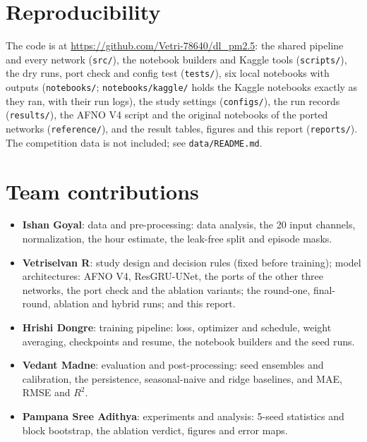 \documentclass[conference]{IEEEtran}
\begin{document}
\section*{Reproducibility}
The code is at \url{https://github.com/Vetri-78640/dl_pm2.5}: the shared pipeline and every network (\texttt{src/}), the notebook builders and Kaggle tools (\texttt{scripts/}), the dry runs, port check and config test (\texttt{tests/}), six local notebooks with outputs (\texttt{notebooks/}; \texttt{notebooks/kaggle/} holds the Kaggle notebooks exactly as they ran, with their run logs), the study settings (\texttt{configs/}), the run records (\texttt{results/}), the AFNO V4 script and the original notebooks of the ported networks (\texttt{reference/}), and the result tables, figures and this report (\texttt{reports/}). The competition data is not included; see \texttt{data/README.md}.

\section*{Team contributions}
\begin{itemize}
\item \textbf{Ishan Goyal}: data and pre-processing: data analysis, the 20 input channels, normalization, the hour estimate, the leak-free split and episode masks.
\item \textbf{Vetriselvan R}: study design and decision rules (fixed before training); model architectures: AFNO V4, ResGRU-UNet, the ports of the other three networks, the port check and the ablation variants; the round-one, final-round, ablation and hybrid runs; and this report.
\item \textbf{Hrishi Dongre}: training pipeline: loss, optimizer and schedule, weight averaging, checkpoints and resume, the notebook builders and the seed runs.
\item \textbf{Vedant Madne}: evaluation and post-processing: seed ensembles and calibration, the persistence, seasonal-naive and ridge baselines, and MAE, RMSE and $R^2$.
\item \textbf{Pampana Sree Adithya}: experiments and analysis: 5-seed statistics and block bootstrap, the ablation verdict, figures and error maps.
\end{itemize}
\end{document}
